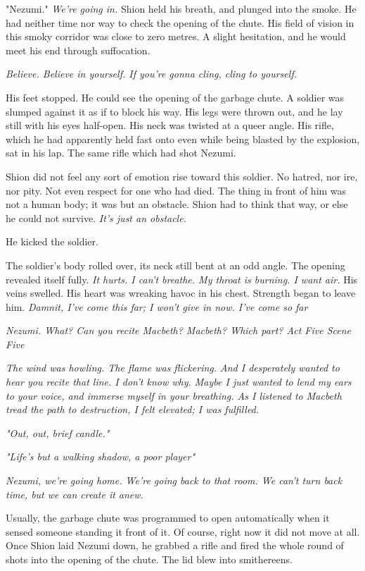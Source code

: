 "Nezumi." \emph{We're going in.} Shion held his breath, and plunged into the
smoke. He had neither time nor way to check the opening of the chute.
His field of vision in this smoky corridor was close to zero metres. A
slight hesitation, and he would meet his end through suffocation.

\emph{Believe. Believe in yourself. If you're gonna cling, cling to yourself.}

His feet stopped. He could see the opening of the garbage chute. A
soldier was slumped against it as if to block his way. His legs were
thrown out, and he lay still with his eyes half-open. His neck was
twisted at a queer angle. His rifle, which he had apparently held fast
onto even while being blasted by the explosion, sat in his lap. The same
rifle which had shot Nezumi.

Shion did not feel any sort of emotion rise toward this soldier. No
hatred, nor ire, nor pity. Not even respect for one who had died. The
thing in front of him was not a human body; it was but an obstacle.
Shion had to think that way, or else he could not survive. \emph{It's just an
obstacle.}

He kicked the soldier.

The soldier's body rolled over, its neck still bent at an odd angle. The
opening revealed itself fully. \emph{It hurts. I can't breathe. My throat is
burning. I want air.} His veins swelled. His heart was wreaking havoc in
his chest. Strength began to leave him. \emph{Damnit, I've come this far; I
won't give in now. I've come so far\el }

\emph{Nezumi. What? Can you recite \emph{Macbeth}? \emph{Macbeth}? Which part? Act Five
Scene Five\el }

\emph{The wind was howling. The flame was flickering. And I desperately wanted
to hear you recite that line. I don't know why. Maybe I just wanted to
lend my ears to your voice, and immerse myself in your breathing. As I
listened to Macbeth tread the path to destruction, I felt elevated; I
was fulfilled.}

\emph{"Out, out, brief candle."}

\emph{"Life's but a walking shadow, a poor player\el"}

\emph{Nezumi, we're going home. We're going back to that room. We can't turn
back time, but we can create it anew.}

Usually, the garbage chute was programmed to open automatically when it
sensed someone standing it front of it. Of course, right now it did not
move at all. Once Shion laid Nezumi down, he grabbed a rifle and fired
the whole round of shots into the opening of the chute. The lid blew
into smithereens.

